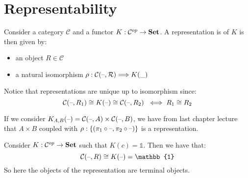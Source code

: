 \chapter{Representability}

\begin{definition}[Representation]
Consider a category $\mathcal{C}$ and a functor $K: \mathcal{C}^{op} \rightarrow \mathbf {Set} $.
A representation is of $K$ is then given by:
\begin{itemize}
  \item an object $R \in \mathcal{C}$
  \item a natural isomorphism $\rho: \mathcal{C(\text{--}, R)} \Longrightarrow K(\_) $
  \end{itemize}
\end{definition}
Notice that representations are unique up to isomorphism since:
\[\mathcal{C}(\text{--}, R_1) \cong K(\text{--}) \cong \mathcal{C}(\text{--}, R_2)\ \iff R_1 \cong R_2\]

\begin{example}
If we consider $K_{A,B}(\text{--}) = \mathcal{C}(\text{--}, A) \times \mathcal{C}(\text{--}, B)$, we have from last chapter lecture that $A \times B$ coupled with $\rho : \{ (\pi_1 \circ \text{--}, \pi_2 \circ \text{--}) \}$ is a representation.
\end{example}

\begin{example}
Consider  $K: \mathcal{C}^{op} \rightarrow \mathbf {Set} $ such that $K(c) = \mathbb{1}$. Then we have that:
\[\mathcal{C}(\phold, R) \cong K(\phold) = \mathbb{1}\]
So here the objects of the representation are terminal objects.

\end{example}

